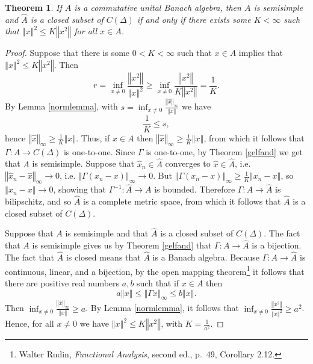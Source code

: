\documentclass{article}
\newcommand{\norm}[1]{\left\Vert #1 \right\Vert}
\newtheorem{theorem}{Theorem}
\theoremstyle{definition}
\begin{document}
\begin{theorem}
If $A$ is a commutative unital Banach algebra, then
$A$ is semisimple and $\widehat{A}$ is a closed subset of $C(\Delta)$ if and only if there exists some $K<\infty$ such that 
$\norm{x}^2 \leq K \norm{x^2}$ for all $x \in A$.
\end{theorem}
\begin{proof}
Suppose that there is some $0<K<\infty$ such that $x \in A$ implies that $\norm{x}^2 \leq K \norm{x^2}$.
Then
\[
r=\inf_{x \neq 0} \frac{\norm{x^2}}{\norm{x}^2} \geq \inf_{x \neq 0} \frac{\norm{x^2}}{K\norm{x^2}} = \frac{1}{K}.
\]
By Lemma \ref{normlemma}, with $s=\inf_{x \neq 0} \frac{\norm{\hat{x}}_\infty}{\norm{x}}$ we have
\[
\frac{1}{K} \leq s,
\]
hence $\norm{\hat{x}}_\infty \geq \frac{1}{K} \norm{x}$.
Thus, if $x \in A$ then $\norm{\hat{x}}_\infty \geq \frac{1}{K}\norm{x}$, from which it follows that 
$\Gamma:A \to C(\Delta)$ is one-to-one. Since $\Gamma$ is one-to-one, by Theorem \ref{gelfand} we get that $A$ is semisimple.
Suppose that $\hat{x}_n \in \widehat{A}$ converges to $\hat{x} \in \widehat{A}$, i.e. $\norm{\hat{x}_n - \hat{x}}_\infty \to 0$, i.e.
$\norm{\Gamma(x_n-x)}_\infty \to 0$. But
$\norm{\Gamma(x_n-x)}_\infty \geq \frac{1}{K} \norm{x_n-x}$, so $\norm{x_n-x} \to 0$, showing that
$\Gamma^{-1}:\widehat{A} \to A$ is bounded. Therefore $\Gamma:A \to \widehat{A}$ is bilipschitz,
and so $\widehat{A}$ is a complete metric space, from which it follows that  $\widehat{A}$ is a closed subset of $C(\Delta)$.

Suppose that $A$ is semisimple and that $\widehat{A}$ is a closed subset of $C(\Delta)$.
The fact that $A$ is semisimple gives us by Theorem \ref{gelfand} that $\Gamma:A \to \widehat{A}$  is a bijection.
The fact that $\widehat{A}$ is closed means that $\widehat{A}$ is a Banach algebra.
Because $\Gamma:A \to \widehat{A}$ is continuous, linear, and a bijection, by the open mapping theorem\footnote{Walter Rudin, {\em Functional Analysis},
second ed., p.~49, Corollary 2.12.}  it follows that there are positive real numbers $a,b$ such that if $x \in A$ then
\[
a \norm{x} \leq \norm{\Gamma x}_\infty \leq b \norm{x}.
\]
Then $\inf_{x \neq 0} \frac{\norm{\hat{x}}_\infty}{\norm{x}} \geq a$. By Lemma \ref{normlemma}, it follows that
$\inf_{x \neq 0} \frac{\norm{x^2}}{\norm{x}^2} \geq a^2$. Hence, for all $x \neq 0$ we have $\norm{x}^2 \leq K \norm{x^2}$, with
$K=\frac{1}{a^2}$.
\end{proof}
\end{document}
